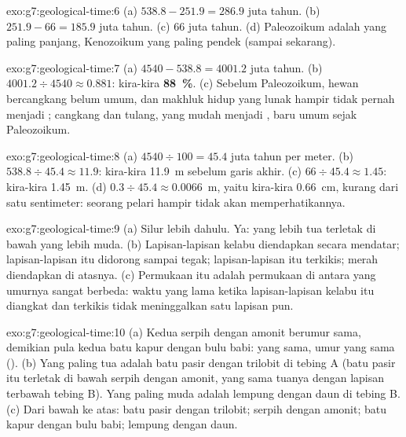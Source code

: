 \begin{solution}{exo:g7:geological-time:6}
(a) $538.8 - 251.9 = 286.9$ juta tahun. (b) $251.9 - 66 = 185.9$
juta tahun. (c) 66 juta tahun. (d) Paleozoikum adalah yang paling panjang,
Kenozoikum yang paling pendek (sampai sekarang).
\end{solution}

\begin{solution}{exo:g7:geological-time:7}
(a) $4540 - 538.8 = 4001.2$ juta tahun. (b) $4001.2 \div 4540
\approx 0.881$: kira-kira \textbf{88~\%}. (c) Sebelum Paleozoikum, hewan
bercangkang belum umum, dan makhluk hidup yang lunak hampir tidak pernah
menjadi ; cangkang dan tulang, yang mudah menjadi , baru umum
sejak Paleozoikum.
\end{solution}

\begin{solution}{exo:g7:geological-time:8}
(a) $4540 \div 100 = 45.4$ juta tahun per meter. (b) $538.8 \div 45.4
\approx 11.9$: kira-kira \qty{11.9}{m} sebelum garis akhir. (c) $66 \div
45.4 \approx 1.45$: kira-kira \qty{1.45}{m}. (d) $0.3 \div 45.4 \approx
0.0066$~m, yaitu kira-kira \qty{0.66}{cm}, kurang dari satu sentimeter:
seorang pelari hampir tidak akan memperhatikannya.
\end{solution}

\begin{solution}{exo:g7:geological-time:9}
(a) Silur lebih dahulu. Ya:  yang lebih tua terletak di bawah 
yang lebih muda. (b) Lapisan-lapisan kelabu diendapkan secara mendatar;
lapisan-lapisan itu didorong sampai tegak; lapisan-lapisan itu terkikis;
 merah diendapkan di atasnya. (c) Permukaan itu adalah permukaan 
di antara  yang umurnya sangat berbeda: waktu yang lama ketika
lapisan-lapisan kelabu itu diangkat dan terkikis tidak meninggalkan satu
lapisan pun.
\end{solution}

\begin{solution}{exo:g7:geological-time:10}
(a) Kedua serpih dengan amonit berumur sama, demikian pula kedua batu kapur
dengan bulu babi:  yang sama, umur yang sama ().
(b) Yang paling tua adalah batu pasir dengan trilobit di tebing A (batu
pasir itu terletak di bawah serpih dengan amonit, yang sama tuanya dengan
lapisan terbawah tebing B). Yang paling muda adalah lempung dengan daun di
tebing B. (c) Dari bawah ke atas: batu pasir dengan trilobit; serpih dengan
amonit; batu kapur dengan bulu babi; lempung dengan daun.
\end{solution}

